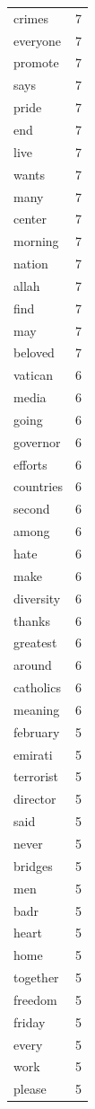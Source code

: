 \begin{tabular}{lr}
crimes & 7 \\
everyone & 7 \\
promote & 7 \\
says & 7 \\
pride & 7 \\
end & 7 \\
live & 7 \\
wants & 7 \\
many & 7 \\
center & 7 \\
morning & 7 \\
nation & 7 \\
allah & 7 \\
find & 7 \\
may & 7 \\
beloved & 7 \\
vatican & 6 \\
media & 6 \\
going & 6 \\
governor & 6 \\
efforts & 6 \\
countries & 6 \\
second & 6 \\
among & 6 \\
hate & 6 \\
make & 6 \\
diversity & 6 \\
thanks & 6 \\
greatest & 6 \\
around & 6 \\
catholics & 6 \\
meaning & 6 \\
february & 5 \\
emirati & 5 \\
terrorist & 5 \\
director & 5 \\
said & 5 \\
never & 5 \\
bridges & 5 \\
men & 5 \\
badr & 5 \\
heart & 5 \\
home & 5 \\
together & 5 \\
freedom & 5 \\
friday & 5 \\
every & 5 \\
work & 5 \\
please & 5 \\

\end{tabular}
